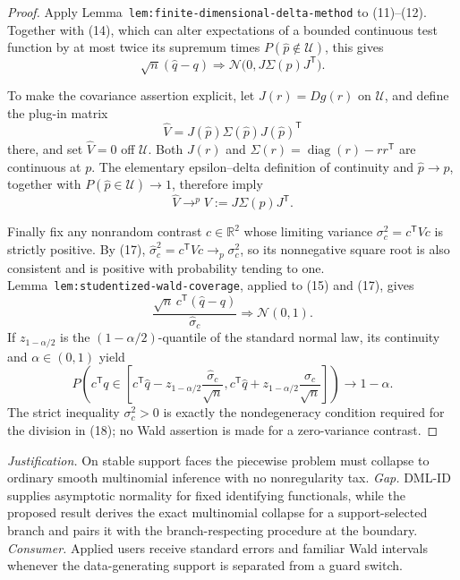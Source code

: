 \documentclass{article}
\begin{document}
\begin{proof}
Apply Lemma~\texttt{lem:finite-dimensional-delta-method} to (11)--(12).
Together with (14), which can alter expectations of a bounded continuous
test function by at most twice its supremum times
\(P(\widehat p\notin\mathcal U)\), this gives
\[
\sqrt n(\widehat q-q)
\Rightarrow
\mathcal N\bigl(0,J\Sigma(p)J^{\mathsf T}\bigr).
\tag{15}
\]

To make the covariance assertion explicit, let \(J(r)=Dg(r)\) on
\(\mathcal U\), and define the plug-in matrix
\[
\widehat V=J(\widehat p)\Sigma(\widehat p)J(\widehat p)^{\mathsf T}
\tag{16}
\]
there, and set \(\widehat V=0\) off \(\mathcal U\).  Both \(J(r)\) and
\(\Sigma(r)=\operatorname{diag}(r)-rr^{\mathsf T}\) are continuous at
\(p\).  The elementary epsilon--delta definition of continuity and
\(\widehat p\to p\), together with
\(P(\widehat p\in\mathcal U)\to1\), therefore imply
\[
\widehat V\mathrel{\mathop{\longrightarrow}^{p}}
V:=J\Sigma(p)J^{\mathsf T}.
\tag{17}
\]

Finally fix any nonrandom contrast \(c\in\mathbb R^2\) whose limiting
variance \(\sigma_c^2=c^{\mathsf T}Vc\) is strictly positive.  By (17),
\(\widehat\sigma_c^2=c^{\mathsf T}\widehat Vc\to_p\sigma_c^2\), so its
nonnegative square root is also consistent and is positive with probability
tending to one.  Lemma~\texttt{lem:studentized-wald-coverage}, applied to
(15) and (17), gives
\[
\frac{\sqrt n\,c^{\mathsf T}(\widehat q-q)}{\widehat\sigma_c}
\Rightarrow\mathcal N(0,1).
\tag{18}
\]
If \(z_{1-\alpha/2}\) is the \((1-\alpha/2)\)-quantile of the standard
normal law, its continuity and \(\alpha\in(0,1)\) yield
\[
P\!\left(
c^{\mathsf T}q\in
\left[c^{\mathsf T}\widehat q
\mathbin{-}z_{1-\alpha/2}\frac{\widehat\sigma_c}{\sqrt n},
c^{\mathsf T}\widehat q
\mathbin{+}z_{1-\alpha/2}\frac{\widehat\sigma_c}{\sqrt n}
\right]
\right)\longrightarrow1-\alpha.
\tag{19}
\]
The strict inequality \(\sigma_c^2>0\) is exactly the nondegeneracy
condition required for the division in (18); no Wald assertion is made for
a zero-variance contrast.
\end{proof}
\par\smallskip\noindent \textit{Justification.} On stable support faces the piecewise problem must collapse to ordinary smooth multinomial inference with no nonregularity tax. \textit{Gap.} DML-ID supplies asymptotic normality for fixed identifying functionals, while the proposed result derives the exact multinomial collapse for a support-selected branch and pairs it with the branch-respecting procedure at the boundary. \textit{Consumer.} Applied users receive standard errors and familiar Wald intervals whenever the data-generating support is separated from a guard switch.
\end{document}
